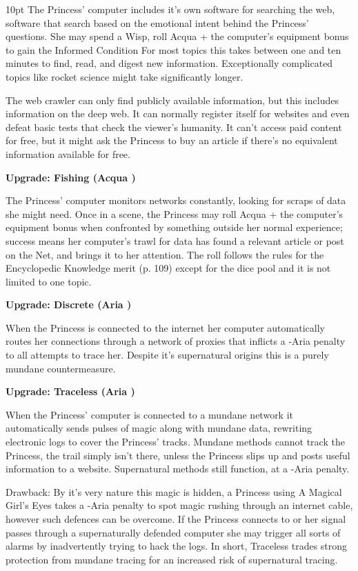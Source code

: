 \begin{myindentpar}{10pt}
The Princess' computer includes it's own software for searching the web, software that search based on the emotional intent behind the Princess' questions. She may spend a Wisp, roll Acqua + the computer's equipment bonus to gain the Informed Condition For most topics this takes between one and ten minutes to find, read, and digest new information. Exceptionally complicated topics like rocket science might take significantly longer.

The web crawler can only find publicly available information, but this includes information on the deep web. It can normally register itself for websites and even defeat basic tests that check the viewer's humanity. It can't access paid content for free, but it might ask the Princess to buy an article if there's no equivalent information available for free. 

\textbf{Upgrade: Fishing (Acqua \textbullet\textbullet)}

The Princess' computer monitors networks constantly, looking for scraps of data she might need. Once in a scene, the Princess may roll Acqua + the computer's equipment bonus when confronted by something outside her normal experience; success means her computer's trawl for data has found a relevant article or post on the Net, and brings it to her attention. The roll follows the rules for the Encyclopedic Knowledge merit (p. 109) except for the dice pool and it is not limited to one topic.

\textbf{Upgrade: Discrete (Aria \textbullet\textbullet)}

When the Princess is connected to the internet her computer automatically routes her connections through a network of proxies that inflicts a -Aria penalty to all attempts to trace her. Despite it's supernatural origins this is a purely mundane countermeasure.

\textbf{Upgrade: Traceless (Aria \textbullet\textbullet)}

When the Princess' computer is connected to a mundane network it automatically sends pulses of magic along with mundane data, rewriting electronic logs to cover the Princess' tracks. Mundane methods cannot track the Princess, the trail simply isn't there, unless the Princess slips up and posts useful information to a website. Supernatural methods still function, at a -Aria penalty. 

Drawback: By it's very nature this magic is hidden, a Princess using A Magical Girl's Eyes takes a -Aria penalty to spot magic rushing through an internet cable, however such defences can be overcome. If the Princess connects to or her signal passes through a supernaturally defended computer she may trigger all sorts of alarms by inadvertently trying to hack the logs. In short, Traceless trades strong protection from mundane tracing for an increased risk of supernatural tracing. \end{myindentpar}

